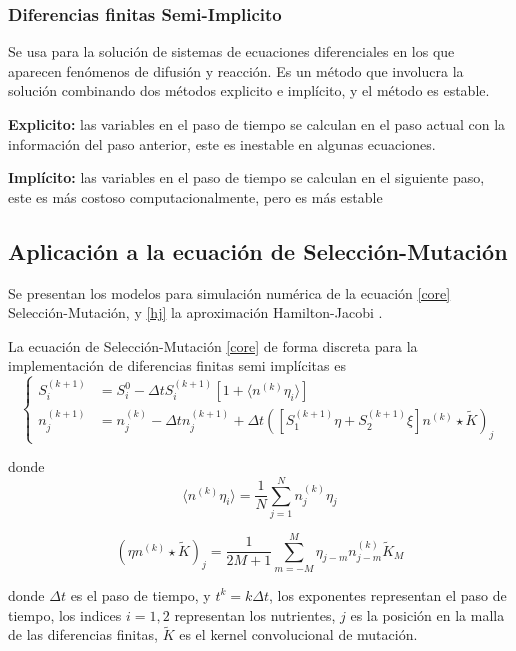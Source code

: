 \subsubsection{Diferencias finitas Semi-Implicito}

Se usa para la solución de sistemas de ecuaciones diferenciales en los que aparecen fenómenos de difusión y reacción. Es un método que involucra la solución combinando dos métodos explicito e implícito, y el método es estable\citep{Monteiro2024}.

\textbf{Explicito:} las variables en el paso de tiempo se calculan en el paso actual con la información del paso anterior, este es inestable en algunas ecuaciones.

\textbf{Implícito:} las variables en el paso de tiempo se calculan en el siguiente paso, este es más costoso computacionalmente, pero es más estable

\subsection{Aplicación a la ecuación de Selección-Mutación}
Se presentan los modelos para simulación numérica de la ecuación \eqref{core} Selección-Mutación, y \eqref{hj} la aproximación Hamilton-Jacobi \citep{dieckman2005}.

La ecuación de Selección-Mutación \eqref{core} de forma discreta para la implementación de diferencias finitas semi implícitas es
\begin{equation}
	\left\{
	\begin{aligned}
		\label{eq:dis}
		S_{i}^{(k+1)} & = S_{i}^{0}-\Delta tS_{i}^{(k+1)}[1+\langle{n^{(k)}\eta_{i}}\rangle]                                          \\
		n_{j}^{(k+1)} & = n_{j}^{(k)}-\Delta t n_{j}^{(k+1)}+\Delta t([S_{1}^{(k+1)}\eta+S_{2}^{(k+1)}\xi]n^{(k)}\star \tilde{K})_{j}
	\end{aligned}
	\right.
\end{equation}

donde
\begin{equation*}
	\langle{n^{(k)}\eta_{i}}\rangle = \frac{1}{N}\sum_{j=1}^{N}n_{j}^{(k)}\eta_{j}
\end{equation*}

\begin{equation*}
	(\eta n^{(k)}\star \tilde{K})_{j}=\frac{1}{2M+1}\sum_{m=-M}^{M}\eta_{j-m}n_{j-m}^{(k)}\tilde{K}_{M}
\end{equation*}

donde $\Delta t$ es el paso de tiempo, y $t^k=k\Delta t$, los exponentes representan el paso de tiempo, los indices $i=1,2$ representan los nutrientes, $j$ es la posición en la malla de las diferencias finitas, $\tilde{K}$ es el kernel convolucional de mutación.

